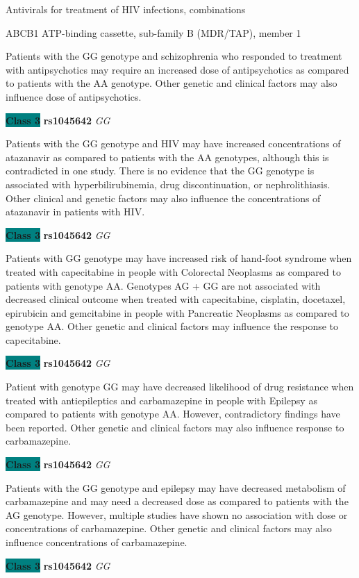 \documentclass{resume} %
\begin{document}
\begin{rSection}{ Antivirals for treatment of HIV infections, combinations }
\begin{rSubsection}{ ABCB1 }{ ATP-binding cassette, sub-family B (MDR/TAP), member 1 }{}{}
\item[] Patients with the GG genotype and schizophrenia who responded to treatment with antipsychotics may require an increased dose of antipsychotics as compared to patients with the AA genotype. Other genetic and clinical factors may also influence dose of antipsychotics. \item \textbf{\colorbox{teal} {Class 3}} \textbf{ rs1045642 } \textit{ GG }
\item[] Patients with the GG genotype and HIV may have increased concentrations of atazanavir as compared to patients with the AA genotypes, although this is contradicted in one study. There is no evidence that the GG genotype is associated with hyperbilirubinemia, drug discontinuation, or nephrolithiasis.  Other clinical and genetic factors may also influence the concentrations of atazanavir in patients with HIV. \item \textbf{\colorbox{teal} {Class 3}} \textbf{ rs1045642 } \textit{ GG }
\item[] Patients with GG genotype may have increased risk of hand-foot syndrome when treated with capecitabine in people with Colorectal Neoplasms as compared to patients with genotype AA. Genotypes AG + GG are not associated with decreased clinical outcome when treated with capecitabine, cisplatin, docetaxel, epirubicin and gemcitabine in people with Pancreatic Neoplasms as compared to genotype AA. Other genetic and clinical factors may influence the response to capecitabine.\item \textbf{\colorbox{teal} {Class 3}} \textbf{ rs1045642 } \textit{ GG }
\item[] Patient with genotype GG may have decreased likelihood of drug resistance when treated with antiepileptics and carbamazepine in people with Epilepsy as compared to patients with genotype AA. However, contradictory findings have been reported. Other genetic and clinical factors may also influence response to carbamazepine.\item \textbf{\colorbox{teal} {Class 3}} \textbf{ rs1045642 } \textit{ GG }
\item[] Patients with the GG genotype and epilepsy may have decreased metabolism of carbamazepine and may need a decreased dose as compared to patients with the AG genotype. However, multiple studies have shown no association with dose or concentrations of carbamazepine. Other genetic and clinical factors may also influence concentrations of carbamazepine.\item \textbf{\colorbox{teal} {Class 3}} \textbf{ rs1045642 } \textit{ GG }

\end{rSubsection}
\end{rSection}
\end{document}
